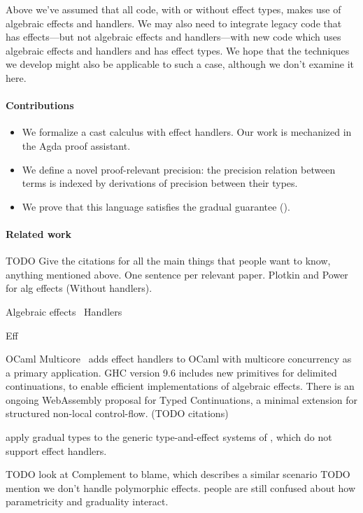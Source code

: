 Above we've assumed that all code, with or without effect types,
makes use of algebraic effects and handlers.
We may also need to integrate legacy code that has effects---but
not algebraic effects and handlers---with new code which uses algebraic effects
and handlers and has effect types.
We hope that the techniques we develop might also be applicable to such a case,
although we don't examine it here.

\paragraph{Contributions}

\begin{itemize}
  \item We formalize a cast calculus with effect handlers.
    Our work is mechanized in the Agda proof assistant.
  \item We define a novel proof-relevant precision: the precision relation
    between terms is indexed by derivations of precision between their types.
  \item We prove that this language satisfies the gradual guarantee
    ().
\end{itemize}

\paragraph{Related work}

TODO Give the citations for all the main things that people want to know, anything mentioned above.
One sentence per relevant paper. Plotkin and Power for alg effects (Without handlers).

Algebraic effects~\citep{plotkin-power-2001}
Handlers~\citep{plotkin-pretnar-2009}

Eff~\citep{bauer-pretnar-2014}

OCaml Multicore~\citep{dolan-2015} adds effect handlers to OCaml with
multicore concurrency as a primary application.
GHC version 9.6 includes new primitives for delimited continuations,
to enable efficient implementations of algebraic effects.
There is an ongoing WebAssembly proposal for Typed Continuations,
a minimal extension for structured non-local control-flow. (TODO citations)

\citet{schwerter-2016} apply gradual types to the generic type-and-effect systems of \citet{marino-2009},
which do not support effect handlers.


TODO look at Complement to blame, which describes a similar scenario
TODO mention we don't handle polymorphic effects.
people are still confused about how parametricity and graduality interact.


